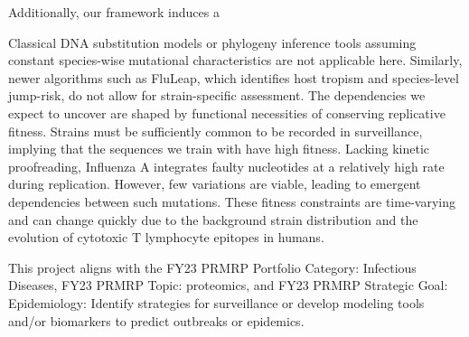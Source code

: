 \documentclass[onecolumn, compsoc,12pt]{IEEEtran}
\begin{document}
Additionally, our framework induces a 

Classical DNA substitution models or phylogeny inference tools assuming constant species-wise mutational characteristics are not applicable here. Similarly, newer algorithms such as FluLeap, which identifies host tropism and species-level jump-risk, do not allow for strain-specific assessment. The dependencies we expect to uncover are shaped by functional necessities of conserving replicative fitness. Strains must be sufficiently common to be recorded in surveillance, implying that the sequences we train with have high fitness. Lacking kinetic proofreading, Influenza A integrates faulty nucleotides at a relatively high rate during replication. However, few variations are viable, leading to emergent dependencies between such mutations. These fitness constraints are time-varying and can change quickly due to the background strain distribution and the evolution of cytotoxic T lymphocyte epitopes in humans.




This project aligns with the FY23 PRMRP Portfolio Category: Infectious Diseases, FY23 PRMRP Topic: proteomics, and FY23 PRMRP Strategic Goal: Epidemiology: Identify strategies for surveillance or develop modeling tools and/or biomarkers to predict outbreaks or epidemics.

\end{document}
